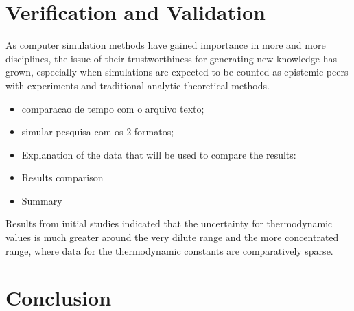 \documentclass[ppgc,mestrado,english]{iiufrgs}
\begin{document}


\chapter{Verification and Validation}

As computer simulation methods have gained importance in more and more disciplines, the issue of their trustworthiness for generating new knowledge has grown, especially when simulations are expected to be counted as epistemic peers with experiments and traditional analytic theoretical methods.

\begin{itemize}
\item comparacao de tempo com o arquivo texto; 
\item simular pesquisa com os 2 formatos;
\end{itemize}

 

\begin{itemize}
\item Explanation of the data that will be used to compare the results: 
\item Results comparison 
\item	Summary
\end{itemize}

Results from initial studies indicated that the uncertainty for thermodynamic values is much greater around the very dilute range and the more concentrated range, where data for the thermodynamic constants are comparatively sparse. 


\chapter{Conclusion}
\end{document}
